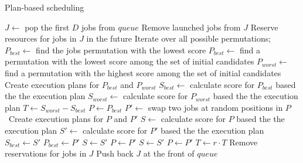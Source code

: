 \documentclass[thesis-en.tex]{subfiles}
\begin{document}
\begin{algorithm}[p]
\caption{Plan-based scheduling}
\label{alg:plan}
\begin{algorithmic}[1]
  \Statex
  \Statex
  \Statex
  \State $J \gets$ pop the first $D$ jobs from $queue$ \label{alg:plan:pop}
  \State {}
  \State Remove launched jobs from $J$
  \State Reserve resources for jobs in $J$ in the future \label{alg:plan:reserve}
  \Statex
    \State Iterate over all possible permutations;
    \State $P_{best} \gets$ find the jobs permutation with the lowest score
  \Statex
  \Else
    \State $P_{best} \gets$ find a permutation with the lowest score among the set of initial candidates
    \State $P_{worst} \gets$ find a permutation with the highest score among the set of initial candidates
    \State Create execution plans for $P_{best}$ and $P_{worst}$
    \State $S_{best} \gets$ calculate score for $P_{best}$ based the the execution plan
    \State $S_{worst} \gets$ calculate score for $P_{worst}$ based the the execution plan
      \State $T \gets S_{worst} - S_{best}$ \label{alg:plan:temp}
      \State $P \gets P_{best}$
          \State $P' \gets$ swap two jobs at random positions in $P$\
          \State Create execution plans for $P$ and $P'$
          \State $S \gets$ calculate score for $P$ based the the execution plan
          \State $S' \gets$ calculate score for $P'$ based the the execution plan
          \If{$S' < S_{best}$}
            \State $S_{best} \gets S'$
            \State $P_{best} \gets P'$
            \State $S \gets S'$
            \State $P \gets P'$
            \State $S \gets S'$
            \State $P \gets P'$
          \EndIf
        \EndFor
        $T \gets r \cdot T$
      \EndFor
    \EndIf
  \EndIf
  \Statex
  \State {}
  \State Remove reservations for jobs in $J$
  \State Push back $J$ at the front of $queue$
\EndProcedure
\end{algorithmic}
\end{algorithm}
\end{document}
